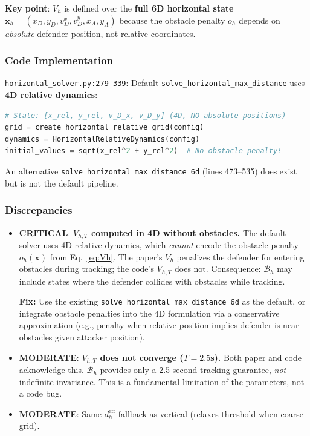 \documentclass[11pt,a4paper]{article}
\begin{document}
\textbf{Key point}: $V_h$ is defined over the \textbf{full 6D horizontal state} $\mathbf{x}_h = (x_D, y_D, v^x_D, v^y_D, x_A, y_A)$ because the obstacle penalty $o_h$ depends on \emph{absolute} defender position, not relative coordinates.

\subsubsection{Code Implementation}

\texttt{horizontal\_solver.py:279--339}: Default \texttt{solve\_horizontal\_max\_distance} uses \textbf{4D relative dynamics}:
\begin{lstlisting}[language=Python]
# State: [x_rel, y_rel, v_D_x, v_D_y] (4D, NO absolute positions)
grid = create_horizontal_relative_grid(config)
dynamics = HorizontalRelativeDynamics(config)
initial_values = sqrt(x_rel^2 + y_rel^2)  # No obstacle penalty!
\end{lstlisting}

An alternative \texttt{solve\_horizontal\_max\_distance\_6d} (lines 473--535) does exist but is not the default pipeline.

\subsubsection{Discrepancies}

\begin{itemize}
\item \textcolor{critred}{\textbf{CRITICAL}}: \textbf{$V_{h,T}$ computed in 4D without obstacles.} The default solver uses 4D relative dynamics, which \emph{cannot} encode the obstacle penalty $o_h(\mathbf{x})$ from Eq.~\eqref{eq:Vh}. The paper's $V_h$ penalizes the defender for entering obstacles during tracking; the code's $V_{h,T}$ does not. Consequence: $\mathcal{B}_h$ may include states where the defender collides with obstacles while tracking.

\textbf{Fix:} Use the existing \texttt{solve\_horizontal\_max\_distance\_6d} as the default, or integrate obstacle penalties into the 4D formulation via a conservative approximation (e.g., penalty when relative position implies defender is near obstacles given attacker position).

\item \textcolor{modoran}{\textbf{MODERATE}}: \textbf{$V_{h,T}$ does not converge ($T=2.5$s).} Both paper and code acknowledge this. $\mathcal{B}_h$ provides only a 2.5-second tracking guarantee, \emph{not} indefinite invariance. This is a fundamental limitation of the parameters, not a code bug.

\item \textcolor{modoran}{\textbf{MODERATE}}: Same $d_h^{\mathrm{eff}}$ fallback as vertical (relaxes threshold when coarse grid).
\end{itemize}
\end{document}
